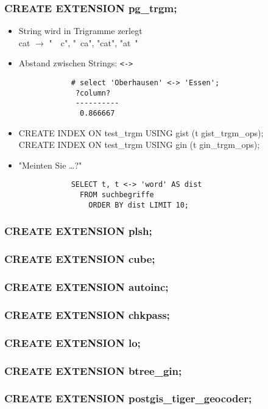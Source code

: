 \documentclass[utf8,hyperref={pdftex,colorlinks,linkcolor=black,citecolor=black,urlcolor=black,filecolor=black,plainpages=false},xcolor=table,hyperref]{beamer}
\begin{document}
\begin{frame}[containsverbatim]
	\frametitle{CREATE EXTENSION pg_trgm;}
	\begin{itemize}
		\item String wird in Trigramme zerlegt \\
			cat $\rightarrow$ "\ \ c", "\ ca", "cat", "{}at\ "
		\item Abstand zwischen Strings: \verb|<->|
			\begin{verbatim}
			# select 'Oberhausen' <-> 'Essen';
			 ?column? 
			 ----------
			  0.866667
			  \end{verbatim}
		  \item CREATE INDEX ON test_trgm USING gist (t gist_trgm_ops); \\
			CREATE INDEX ON test_trgm USING gin (t gin_trgm_ops);
		\item "Meinten Sie \dots?"\begin{verbatim}
			SELECT t, t <-> 'word' AS dist
			  FROM suchbegriffe
			    ORDER BY dist LIMIT 10;
			    \end{verbatim}
		    
	\end{itemize}
\end{frame}

\begin{frame}
	\frametitle{CREATE EXTENSION plsh;}
\end{frame}

\begin{frame}
	\frametitle{CREATE EXTENSION cube;}
\end{frame}

\begin{frame}
	\frametitle{CREATE EXTENSION autoinc;}
\end{frame}

\begin{frame}
	\frametitle{CREATE EXTENSION chkpass;}
\end{frame}

\begin{frame}
	\frametitle{CREATE EXTENSION lo;}
\end{frame}

\begin{frame}
	\frametitle{CREATE EXTENSION btree_gin;}
\end{frame}

\begin{frame}
	\frametitle{CREATE EXTENSION postgis_tiger_geocoder;}
\end{frame}
\end{document}
